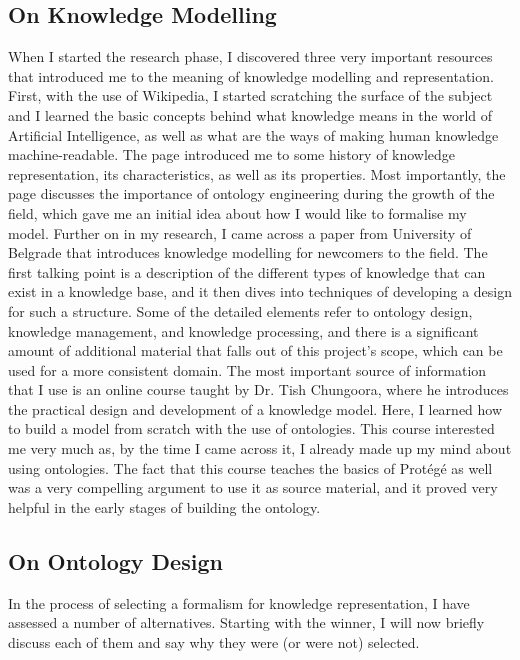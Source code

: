 \documentclass[titlepage]{article}
\begin{document}
\subsection{On Knowledge Modelling}
When I started the research phase, I discovered three very important resources that introduced me to the meaning of knowledge modelling and representation.
\newline
First, with the use of Wikipedia\cite{wikikrr}, I started scratching the surface of the subject and I learned the basic concepts behind what knowledge means in the world of Artificial Intelligence, as well as what are the ways of making human knowledge machine-readable. The page introduced me to some history of knowledge representation, its characteristics, as well as its properties. Most importantly, the page discusses the importance of ontology engineering during the growth of the field, which gave me an initial idea about how I would like to formalise my model.
\newline
Further on in my research, I came across a paper from University of Belgrade\cite{belgradepaper} that introduces knowledge modelling for newcomers to the field. The first talking point is a description of the different types of knowledge that can exist in a knowledge base, and it then dives into techniques of developing a design for such a structure. Some of the detailed elements refer to ontology design, knowledge management, and knowledge processing, and there is a significant amount of additional material that falls out of this project's scope, which can be used for a more consistent domain.
\newline
The most important source of information that I use is an online course taught by Dr. Tish Chungoora\cite{udemy}, where he introduces the practical design and development of a knowledge model. Here, I learned how to build a model from scratch with the use of ontologies. This course interested me very much as, by the time I came across it, I already made up my mind about using ontologies. The fact that this course teaches the basics of Prot\'eg\'e as well was a very compelling argument to use it as source material, and it proved very helpful in the early stages of building the ontology.

\subsection{On Ontology Design}
In the process of selecting a formalism for knowledge representation, I have assessed a number of alternatives. Starting with the winner, I will now briefly discuss each of them and say why they were (or were not) selected.
\end{document}
